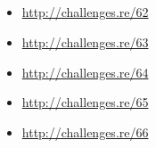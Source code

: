 \subsection{\Exercises}

\begin{itemize}
	\item \url{http://challenges.re/62}
	\item \url{http://challenges.re/63}
	\item \url{http://challenges.re/64}
	\item \url{http://challenges.re/65}
	\item \url{http://challenges.re/66}
\end{itemize}

